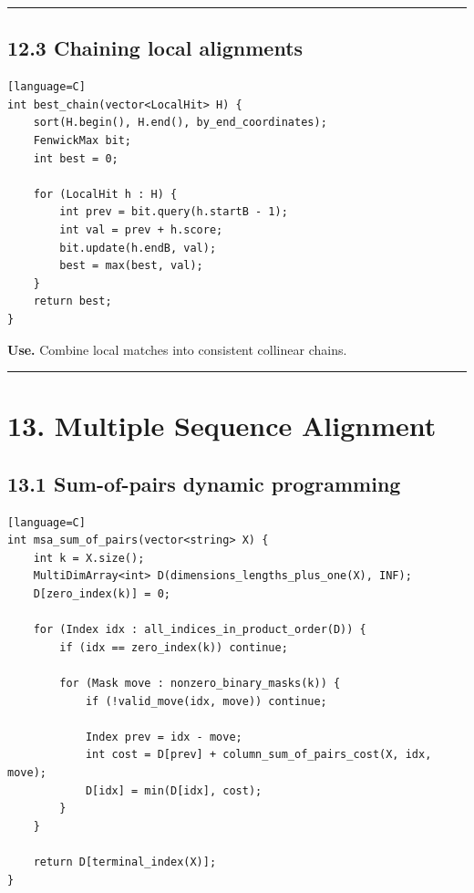 \documentclass[11pt]{article}
\begin{document}
\begin{center}\rule{0.5\linewidth}{0.5pt}\end{center}

\subsection{12.3 Chaining local alignments}\label{chaining-local-alignments}

\begin{verbatim}[language=C]
int best_chain(vector<LocalHit> H) {
    sort(H.begin(), H.end(), by_end_coordinates);
    FenwickMax bit;
    int best = 0;

    for (LocalHit h : H) {
        int prev = bit.query(h.startB - 1);
        int val = prev + h.score;
        bit.update(h.endB, val);
        best = max(best, val);
    }
    return best;
}
\end{verbatim}

\textbf{Use.} Combine local matches into consistent collinear chains.

\begin{center}\rule{0.5\linewidth}{0.5pt}\end{center}

\section{13. Multiple Sequence Alignment}\label{multiple-sequence-alignment}

\subsection{13.1 Sum-of-pairs dynamic programming}\label{sum-of-pairs-dynamic-programming}

\begin{verbatim}[language=C]
int msa_sum_of_pairs(vector<string> X) {
    int k = X.size();
    MultiDimArray<int> D(dimensions_lengths_plus_one(X), INF);
    D[zero_index(k)] = 0;

    for (Index idx : all_indices_in_product_order(D)) {
        if (idx == zero_index(k)) continue;

        for (Mask move : nonzero_binary_masks(k)) {
            if (!valid_move(idx, move)) continue;

            Index prev = idx - move;
            int cost = D[prev] + column_sum_of_pairs_cost(X, idx, move);
            D[idx] = min(D[idx], cost);
        }
    }

    return D[terminal_index(X)];
}
\end{verbatim}
\end{document}
